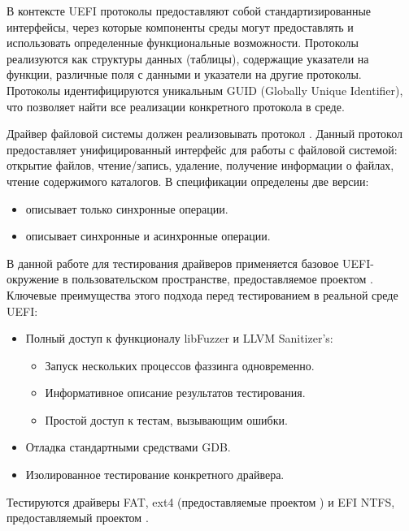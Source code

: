 В контексте UEFI протоколы предоставляют собой стандартизированные интерфейсы, через которые компоненты среды могут предоставлять и использовать определенные функциональные возможности. Протоколы реализуются как структуры данных (таблицы), содержащие указатели на функции, различные поля с данными и указатели на другие протоколы. Протоколы идентифицируются уникальным GUID (Globally Unique Identifier), что позволяет найти все реализации конкретного протокола в среде.

 Драйвер файловой системы должен реализовывать протокол . Данный протокол предоставляет унифицированный интерфейс для работы с файловой системой: открытие файлов, чтение/запись, удаление, получение информации о файлах, чтение содержимого каталогов. В спецификации определены две версии:
 \begin{itemize}
 	\item {} описывает только синхронные операции.
 	\item {} описывает синхронные и асинхронные операции.
 \end{itemize}
 
В данной работе для тестирования драйверов применяется базовое UEFI-окружение в пользовательском пространстве, предоставляемое проектом  \cite{OpenCorePkg}. Ключевые преимущества этого подхода перед тестированием в реальной среде UEFI:
\begin{itemize}
	\item Полный доступ к функционалу libFuzzer и LLVM Sanitizer's:
	\begin{itemize}
		\item Запуск нескольких процессов фаззинга  одновременно.
		\item Информативное описание результатов тестирования.
		\item Простой доступ к тестам, вызывающим ошибки.
	\end{itemize}
	\item Отладка стандартными средствами GDB.
	\item Изолированное тестирование конкретного драйвера.
\end{itemize}
 
 Тестируются драйверы FAT, ext4 (предоставляемые проектом  \cite{Audk}) и EFI NTFS, предоставляемый проектом \cite{OpenCorePkg}.  